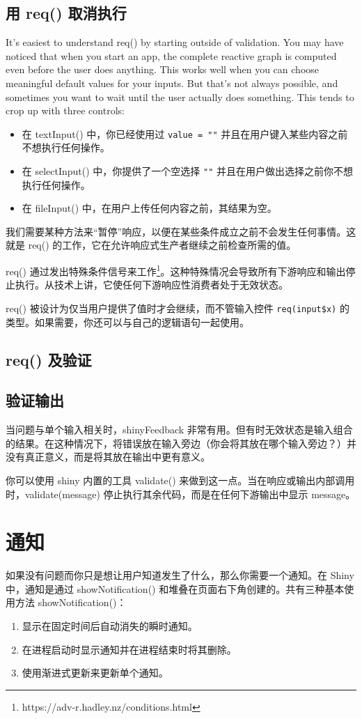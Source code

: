 \subsection{用 req() 取消执行}
It’s easiest to understand req() by starting outside of validation. You may have noticed that when you start an app, the complete reactive graph is computed even before the user does anything. This works well when you can choose meaningful default values for your inputs. But that’s not always possible, and sometimes you want to wait until the user actually does something. This tends to crop up with three controls:
\begin{itemize}
    \item 在 textInput() 中，你已经使用过 \verb|value = ""| 并且在用户键入某些内容之前不想执行任何操作。
    \item 在 selectInput() 中，你提供了一个空选择 \verb|""| 并且在用户做出选择之前你不想执行任何操作。
    \item 在 fileInput() 中，在用户上传任何内容之前，其结果为空。
\end{itemize}

我们需要某种方法来“暂停”响应，以便在某些条件成立之前不会发生任何事情。这就是 req() 的工作，它在允许响应式生产者继续之前检查所需的值。

req() 通过发出特殊条件信号来工作\footnote{https://adv-r.hadley.nz/conditions.html}。这种特殊情况会导致所有下游响应和输出停止执行。从技术上讲，它使任何下游响应性消费者处于无效状态。

req() 被设计为仅当用户提供了值时才会继续，而不管输入控件 \verb|req(input$x)| 的类型。如果需要，你还可以与自己的逻辑语句一起使用。
\subsection{req() 及验证}
\subsection{验证输出}
当问题与单个输入相关时，shinyFeedback 非常有用。但有时无效状态是输入组合的结果。在这种情况下，将错误放在输入旁边（你会将其放在哪个输入旁边？）并没有真正意义，而是将其放在输出中更有意义。

你可以使用 shiny 内置的工具 validate() 来做到这一点。当在响应或输出内部调用时，validate(message) 停止执行其余代码，而是在任何下游输出中显示 message。

\section{通知}
如果没有问题而你只是想让用户知道发生了什么，那么你需要一个通知。在 Shiny 中，通知是通过 showNotification() 和堆叠在页面右下角创建的。共有三种基本使用方法 showNotification()：
\begin{enumerate}
    \item 显示在固定时间后自动消失的瞬时通知。
    \item 在进程启动时显示通知并在进程结束时将其删除。
    \item 使用渐进式更新来更新单个通知。
\end{enumerate}
